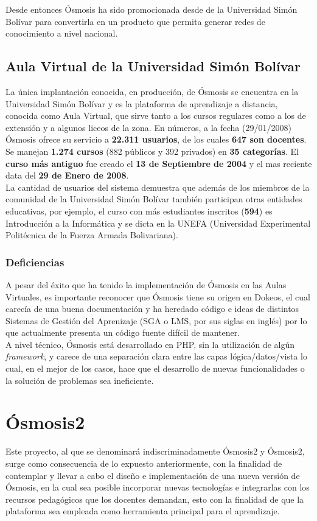 Desde entonces Ósmosis ha sido promocionada desde de la Universidad Simón Bolívar para convertirla en un producto que permita generar redes de conocimiento a nivel nacional.

\subsection[Aula Virtual (USB)]{Aula Virtual de la Universidad Simón Bolívar}
La única implantación conocida, en producción, de Ósmosis se encuentra en la Universidad Simón Bolívar y es la plataforma de aprendizaje a distancia, conocida como Aula Virtual, que sirve tanto a los cursos regulares como a los de extensión y a algunos liceos de la zona. En números, a la fecha (29/01/2008) Ósmosis ofrece su servicio a \textbf{22.311 usuarios}, de los cuales \textbf{647 son docentes}. Se manejan \textbf{1.274 cursos} (882 públicos y 392 privados) en \textbf{35 categorías}. El \textbf{curso más antiguo} fue creado el \textbf{13 de Septiembre de 2004} y el mas reciente data del \textbf{29 de Enero de 2008}.\\

La cantidad de usuarios del sistema demuestra que además de los miembros de la comunidad de la Universidad Simón Bolívar también participan otras entidades educativas, por ejemplo, el curso con más estudiantes inscritos (\textbf{594}) es Introducción a la Informática y se dicta en la UNEFA (Universidad Experimental Politécnica de la Fuerza Armada Bolivariana).

\subsubsection{Deficiencias}
A pesar del éxito que ha tenido la implementación de Ósmosis en las Aulas Virtuales, es importante reconocer que Ósmosis tiene su origen en Dokeos, el cual carecía de una buena documentación y ha heredado código e ideas de distintos Sistemas de Gestión del Aprenizaje (SGA o LMS, por sus siglas en inglés) por lo que actualmente presenta un código fuente difícil de mantener.\\

A nivel técnico, Ósmosis está desarrollado en PHP, sin la utilización de algún \emph{framework}, y carece de una separación clara entre las capas lógica/datos/vista lo cual, en el mejor de los casos, hace que el desarrollo de nuevas funcionalidades o la solución de problemas sea ineficiente.

\section{Ósmosis2}
Este proyecto, al que se denominará indiscriminadamente Ósmosis2 y Ósmosis2, surge como consecuencia de lo expuesto anteriormente, con la finalidad de contemplar y llevar a cabo el diseño e implementación de una nueva versión de Ósmosis, en la cual sea posible incorporar nuevas tecnologías e integrarlas con los recursos pedagógicos que los docentes demandan, esto con la finalidad de que la plataforma sea empleada como herramienta principal para el aprendizaje.\\

